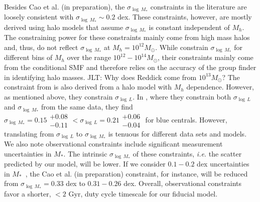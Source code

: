\documentclass[12pt, letterpaper, preprint, tighten]{aastex62}
\newcommand{\ch}[1]{{\color{orange}{\bf CH:} #1}}
\newcommand{\edt}[1]{{\color{dred}{\bf} #1}}
\begin{document}
\edt{Besides Cao et al. (in preparation), the $\sigma_{\log\,M_*}$ constraints 
in the literature are loosely consistent with $\sigma_{\log\,M_*} \sim 0.2$ dex.
These constraints, however, are mostly derived using halo models that assume 
$\sigma_{\log\,M_*}$ is constant independent of $M_h$. The constraining power for
these constraints mainly come from high mass halos and, thus, do not reflect  
$\sigma_{\log\,M_*}$ at $M_h=10^{12}M_\odot$}. 
While \cite{reddick2013} constrain $\sigma_{\log\,M_*}$ for different bins of 
$M_h$ over the range $10^{12} - 10^{14} M_\odot$, %
their constraints mainly come from the conditional SMF and therefore relies on 
the accuracy of the \cite{tinker2011} group finder in identifying halo masses. 
\ch{JLT: Why does Reddick come from $10^{13} M_\odot$?} %
The constraint from \cite{lange2018a} is also derived from a halo model 
with $M_h$ dependence. However, as mentioned above, they constrain $\sigma_{\log\,L}$. 
In \cite{more2011}, where they constrain both $\sigma_{\log\,L}$ and $\sigma_{\log\,M_*}$ 
from the same data, they find 
$\sigma_{\log\,M_*} = 0.15\substack{+0.08\\ -0.11} < \sigma_{\log\,L} = 0.21\substack{+0.06\\ -0.04}$
for blue centrals. However, translating from $\sigma_{\log\,L}$ to 
$\sigma_{\log\,M_*}$ is tenuous for different data sets and models. %
\edt{We also note observational constraints include significant measurement 
uncertainties in $M_*$. The intrinsic $\sigma_{\log\,M_*}$ of these constraints, 
\emph{i.e.} the scatter predicted by our model, will be lower. If we consider 
$0.1 - 0.2$ dex uncertainties in $M_*$~\citep{roediger2015}, the 
Cao et al. (in preparation) constraint, for instance, will be reduced from 
$\sigma_{\log\,M_*} = 0.33$ dex to $0.31 - 0.26$ dex. Overall, observational 
constraints favor a shorter, $< 2$ Gyr, duty cycle timescale for our fiducial 
model.}
\end{document}
